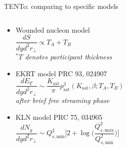 \documentclass[aspectratio=43]{beamer}
\theoremstyle{definition}
\newcommand{\trento}{T\raisebox{-0.3ex}{R}ENTo}
\begin{document}
\begin{frame}[t]{\trento: comparing to specific models}
\begin{columns}
\begin{column}{.6\textwidth}
      \vspace{-0.75 cm}
      \begin{itemize}
        \item Wounded nucleon model \\[1ex]
          $\dfrac{dS}{dy d^2r_\perp} \propto T_A + T_B$ \\[1ex]
          \emph{\scriptsize $^*T$ denotes participant thickness} \\[2ex]
        \item EKRT model \quad \textcolor{theme}{\scriptsize PRC 93, 024907} \\[1ex]
          $\dfrac{dE_T}{dy d^2r_\perp} \sim \dfrac{K_\mathrm{sat}}{\pi} p_\mathrm{sat}^3(K_\mathrm{sat}, \beta; T_A, T_B)$ \\[1ex]
          \emph{\scriptsize after brief free streaming phase} \\[2ex]
        \item KLN model \quad \textcolor{theme}{\scriptsize PRC 75, 034905} \\[1ex]
          $\dfrac{dN_g}{dy d^2r_\perp} \sim Q_{s,\mathrm{min}}^2 \Bigg[2 + \log\Bigg(\dfrac{Q_{s,\mathrm{max}}^2}{Q_{s,\mathrm{min}}^2}\Bigg)\Bigg]$\\[1ex]
      \end{itemize}
    \end{column}
  \end{columns}
\end{frame}
\end{document}
